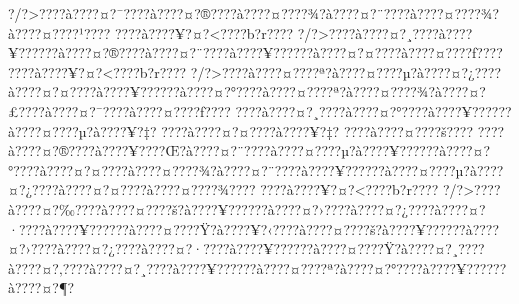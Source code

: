 \documentclass[11pt, openany]{book}
\begin{document}
{{{{{{{{{{{{{{{{{{{{{{{{{{{{{{{{{{{{{{{{{{{{{{{{{{{{{{{{{{{{{{{{{{{{{{{{{{{{{{{{{{{{{{{{{{{{{{{{{{{{{{{{{{{{{?/?\textgreater{}???\textbar{}?à???\textbar{}?¤?¯???\textbar{}?à???\textbar{}?¤?®???\textbar{}?à???\textbar{}?¤???\textbar{}?¾?à???\textbar{}?¤?¨???\textbar{}?à???\textbar{}?¤???\textbar{}?¾?à???\textbar{}?¤???\textbar{}?¹???\textbar{}?
???\textbar{}?à???\textbar{}?¥?¤?\textless{}???\textbar{}?b?r???\textbar{}?
?/?\textgreater{}???\textbar{}?à???\textbar{}?¤?¸???\textbar{}?à???\textbar{}?¥?????\textbar{}?à???\textbar{}?¤?®???\textbar{}?à???\textbar{}?¤?¨???\textbar{}?à???\textbar{}?¥?????\textbar{}?à???\textbar{}?¤?¤???\textbar{}?à???\textbar{}?¤???\textbar{}?ƒ???\textbar{}?
???\textbar{}?à???\textbar{}?¥?¤?\textless{}???\textbar{}?b?r???\textbar{}?
?/?\textgreater{}???\textbar{}?à???\textbar{}?¤???\textbar{}?ª?à???\textbar{}?¤???\textbar{}?µ?à???\textbar{}?¤?¿???\textbar{}?à???\textbar{}?¤?¤???\textbar{}?à???\textbar{}?¥?????\textbar{}?à???\textbar{}?¤?°???\textbar{}?à???\textbar{}?¤???\textbar{}?ª?à???\textbar{}?¤???\textbar{}?¾?à???\textbar{}?¤?£???\textbar{}?à???\textbar{}?¤?¯???\textbar{}?à???\textbar{}?¤???\textbar{}?ƒ???\textbar{}?
???\textbar{}?à???\textbar{}?¤?¸???\textbar{}?à???\textbar{}?¤?°???\textbar{}?à???\textbar{}?¥?????\textbar{}?à???\textbar{}?¤???\textbar{}?µ?à???\textbar{}?¥?‡?
???\textbar{}?à???\textbar{}?¤?¤???\textbar{}?à???\textbar{}?¥?‡?
???\textbar{}?à???\textbar{}?¤???\textbar{}?š???\textbar{}?
???\textbar{}?à???\textbar{}?¤?®???\textbar{}?à???\textbar{}?¥???\textbar{}?Œ?à???\textbar{}?¤?¨???\textbar{}?à???\textbar{}?¤???\textbar{}?µ?à???\textbar{}?¥?????\textbar{}?à???\textbar{}?¤?°???\textbar{}?à???\textbar{}?¤?¤???\textbar{}?à???\textbar{}?¤???\textbar{}?¾?à???\textbar{}?¤?¨???\textbar{}?à???\textbar{}?¥?????\textbar{}?à???\textbar{}?¤???\textbar{}?µ?à???\textbar{}?¤?¿???\textbar{}?à???\textbar{}?¤?¤???\textbar{}?à???\textbar{}?¤???\textbar{}?¾???\textbar{}?
???\textbar{}?à???\textbar{}?¥?¤?\textless{}???\textbar{}?b?r???\textbar{}?
?/?\textgreater{}???\textbar{}?à???\textbar{}?¤?‰???\textbar{}?à???\textbar{}?¤???\textbar{}?š?à???\textbar{}?¥?????\textbar{}?à???\textbar{}?¤?›???\textbar{}?à???\textbar{}?¤?¿???\textbar{}?à???\textbar{}?¤?·???\textbar{}?à???\textbar{}?¥?????\textbar{}?à???\textbar{}?¤???\textbar{}?Ÿ?à???\textbar{}?¥?‹???\textbar{}?à???\textbar{}?¤???\textbar{}?š?à???\textbar{}?¥?????\textbar{}?à???\textbar{}?¤?›???\textbar{}?à???\textbar{}?¤?¿???\textbar{}?à???\textbar{}?¤?·???\textbar{}?à???\textbar{}?¥?????\textbar{}?à???\textbar{}?¤???\textbar{}?Ÿ?à???\textbar{}?¤?¸???\textbar{}?à???\textbar{}?¤?‚???\textbar{}?à???\textbar{}?¤?¸???\textbar{}?à???\textbar{}?¥?????\textbar{}?à???\textbar{}?¤???\textbar{}?ª?à???\textbar{}?¤?°???\textbar{}?à???\textbar{}?¥?????\textbar{}?à???\textbar{}?¤?¶?
}}}}}}}}}}}}}}}}}}}}}}}}}}}}}}}}}}}}}}}}}}}}}}}}}}}}}}}}}}}}}}}}}}}}}}}}}}}}}}}}}}}}}}}}}}}}}}}}}}}}}}}}}}}}}
\end{document}
